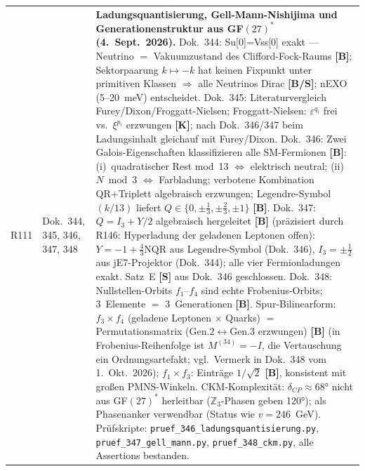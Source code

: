 \begin{longtable}{@{}p{0.9cm}p{3.1cm}p{10.2cm}@{}}
R111 & Dok.~344, 345, 346, 347, 348 & \textbf{Ladungsquantisierung, Gell-Mann-Nishijima und Generationenstruktur aus GF$(27)^*$ (4.~Sept.~2026).} Dok.~344: Su[0]=Vss[0] exakt --- Neutrino $=$ Vakuumzustand des Clifford-Fock-Raums \textbf{[B]}; Sektorpaarung $k\mapsto-k$ hat keinen Fixpunkt unter primitiven Klassen $\Rightarrow$ alle Neutrinos Dirac \textbf{[B/S]}; nEXO (5--20~meV) entscheidet. Dok.~345: Literaturvergleich Furey/Dixon/Froggatt-Nielsen; Froggatt-Nielsen: $\varepsilon^{q_i}$ frei vs.\ $\xi^{p_i}$ erzwungen \textbf{[K]}; nach Dok.~346/347 beim Ladungsinhalt gleichauf mit Furey/Dixon. Dok.~346: Zwei Galois-Eigenschaften klassifizieren alle SM-Fermionen \textbf{[B]}: (i)~quadratischer Rest mod~13 $\Leftrightarrow$ elektrisch neutral; (ii)~$N\bmod3$ $\Leftrightarrow$ Farbladung; verbotene Kombination QR+Triplett algebraisch erzwungen; Legendre-Symbol $(k/13)$ liefert $Q\in\{0,\pm\tfrac{1}{3},\pm\tfrac{2}{3},\pm1\}$ \textbf{[B]}. Dok.~347: $Q=I_3+Y/2$ algebraisch hergeleitet \textbf{[B]} (präzisiert durch R146: Hyperladung der geladenen Leptonen offen): $Y=-1+\tfrac{4}{3}\mathrm{NQR}$ aus Legendre-Symbol (Dok.~346), $I_3=\pm\tfrac{1}{2}$ aus jE7-Projektor (Dok.~344); alle vier Fermionladungen exakt. Satz~E \textbf{[S]} aus Dok.~346 geschlossen. Dok.~348: Nullstellen-Orbits $f_1$--$f_4$ sind echte Frobenius-Orbits; 3~Elemente $=$ 3~Generationen \textbf{[B]}. Spur-Bilinearform: $f_3\times f_4$ (geladene Leptonen $\times$ Quarks) $=$ Permutationsmatrix (Gen.$2\leftrightarrow$Gen.$3$ erzwungen) \textbf{[B]} (in Frobenius-Reihenfolge ist $M^{(34)}=-I$, die Vertauschung ein Ordnungsartefakt; vgl.\ Vermerk in Dok.~348 vom 1.~Okt.~2026); $f_1\times f_3$: Einträge $1/\sqrt{2}$ \textbf{[B]}, konsistent mit großen PMNS-Winkeln. CKM-Komplexität: $\delta_{CP}\approx68°$ nicht aus GF$(27)^*$ herleitbar ($\mathbb{Z}_3$-Phasen geben 120°); als Phasenanker verwendbar (Status wie $v=246$~GeV). Prüfskripte: \texttt{pruef\_346\_ladungsquantisierung.py}, \texttt{pruef\_347\_gell\_mann.py}, \texttt{pruef\_348\_ckm.py}, alle Assertions bestanden. \\

\end{longtable}
